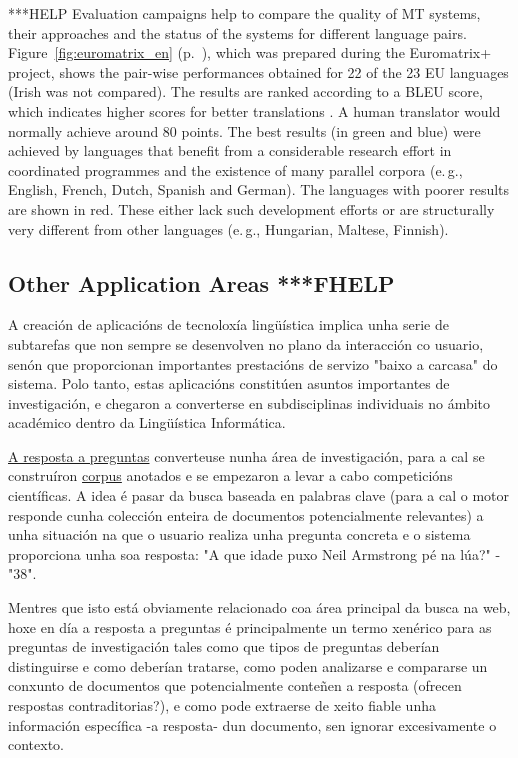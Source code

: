 \begin{multicols}{2}
***HELP
Evaluation campaigns help to compare the quality of MT systems, their approaches and the status of the systems for different language pairs. Figure~\ref{fig:euromatrix_en} (p.~\pageref{fig:euromatrix_en}), which was prepared during the Euromatrix+ project, shows the pair-wise performances obtained for 22 of the 23 EU languages (Irish was not compared). The results are ranked according to a BLEU score, which indicates higher scores for better translations \cite{bleu1}. A human translator would normally achieve around 80 points. The best results (in green and blue) were achieved by languages that benefit from a considerable research effort in coordinated programmes and the existence of many parallel corpora (e.\,g., English, French, Dutch, Spanish and German). The languages with poorer results are shown in red. These either lack such development efforts or are structurally very different from other languages (e.\,g., Hungarian, Maltese, Finnish).

\subsection{Other Application Areas ***FHELP}

   A creación de aplicacións de tecnoloxía lingüística implica unha serie de subtarefas que non sempre se desenvolven no plano da interacción co usuario, senón que proporcionan importantes prestacións de servizo "baixo a carcasa" do sistema. Polo tanto, estas aplicacións constitúen asuntos importantes de investigación, e chegaron a converterse en subdisciplinas individuais no ámbito académico dentro da Lingüística Informática. 

\uline{A resposta a preguntas} converteuse nunha área de investigación, para a cal se construíron \uline{corpus} anotados e se empezaron a levar a cabo competicións científicas. A idea é pasar da busca baseada en palabras clave (para a cal o motor responde cunha colección enteira de documentos potencialmente relevantes) a unha situación na que o usuario realiza unha pregunta concreta e o sistema proporciona unha soa resposta: "A que idade puxo Neil Armstrong pé na lúa?" - "38". 

Mentres que isto está obviamente relacionado coa área principal da busca na web, hoxe en día a resposta a preguntas é principalmente un termo xenérico para as preguntas de investigación tales como que tipos de preguntas deberían distinguirse e como deberían tratarse, como poden analizarse e compararse un conxunto de documentos que potencialmente conteñen a resposta (ofrecen respostas contraditorias?), e como pode extraerse de xeito fiable unha información específica -a resposta- dun documento, sen ignorar excesivamente o contexto. 


\end{multicols}
